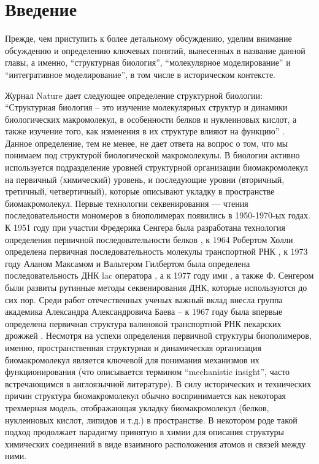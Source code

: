 \section{Введение}
Прежде, чем приступить к более детальному обсуждению, уделим внимание обсуждению и определению ключевых понятий, вынесенных в название данной главы, а именно, ``структурная биология'', ``молекулярное моделирование'' и ``интегративное моделирование'', в том числе в историческом контексте.

Журнал Nature дает следующее определение структурной биологии: ``Структурная биология -- это изучение молекулярных структур и динамики биологических макромолекул, в особенности белков и нуклеиновых кислот, а также изучение того, как изменения в их структуре влияют на функцию'' \cite{noauthor_structural_nodate}. Данное определение, тем не менее, не дает ответа на вопрос о том, что мы понимаем под структурой биологической макромолекулы. В биологии активно используется подразделение уровней структурной организации биомакромолекул на первичный (химический) уровень, и последующие уровни (вторичный, третичный, четвертичный), которые описывают укладку в пространстве биомакромолекул.  Первые технологии секвенирования — чтения последовательности мономеров в биополимерах появились в 1950-1970-ых годах. К 1951 году при участии Фредерика Сенгера была разработана технология определения первичной последовательности белков \cite{sanger_amino-acid_1951}, к 1964 Робертом Холли определена первичная последовательность молекулы транспортной РНК \cite{holley_structure_1965}, к 1973 году Аланом Максамом и Вальтером Гилбертом была определена последовательность ДНК lac оператора \cite{gilbert_nucleotide_1973}, а к 1977 году ими \cite{maxam_new_1977}, а также Ф. Сенгером \cite{sanger_dna_1977} были развиты рутинные методы секвенирования ДНК, которые используются до сих пор. Среди работ отечественных ученых важный вклад внесла группа академика Александра Александровича Баева -- к 1967 году была впервые определена первичная структура валиновой транспортной РНК пекарских дрожжей \cite{baev_pervichnaya_1967}.
Несмотря на успехи определения первичной структуры биополимеров, именно, пространственная структурная и динамическая организация биомакромолекул является ключевой для понимания механизмов их функционирования (что описывается термином ``mechanistic insight'', часто встречающимся в англоязычной литературе).  В силу исторических и технических причин структура биомакромолекул обычно воспринимается как некоторая трехмерная модель, отображающая укладку биомакромолекул (белков, нуклеиновых кислот, липидов и т.д.) в пространстве. В некотором роде такой подход продолжает парадигму принятую в химии для описания структуры химических соединений в виде взаимного расположения атомов и связей между ними.  
